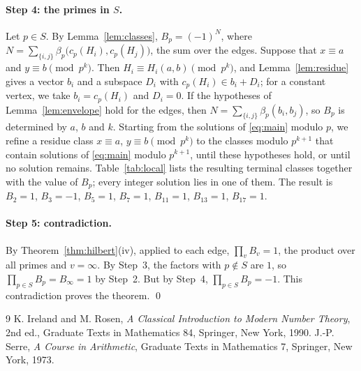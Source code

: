 \documentclass[11pt]{article}
\begin{document}
\paragraph{Step 4: the primes in $S$.} Let $p\in S$. By Lemma~\ref{lem:classes}, $B_p=(-1)^{N}$, where $N=\sum_{\{i,j\}}\beta_p\bigl(c_p(H_i),c_p(H_j)\bigr)$, the sum over the edges. Suppose that $x\equiv a$ and $y\equiv b\pmod{p^k}$. Then $H_i\equiv H_i(a,b)\pmod{p^k}$, and Lemma~\ref{lem:residue} gives a vector $b_i$ and a subspace $D_i$ with $c_p(H_i)\in b_i+D_i$; for a constant vertex, we take $b_i=c_p(H_i)$ and $D_i=0$. If the hypotheses of Lemma~\ref{lem:envelope} hold for the edges, then $N=\sum_{\{i,j\}}\beta_p(b_i,b_j)$, so $B_p$ is determined by $a$, $b$ and $k$. Starting from the solutions of \eqref{eq:main} modulo $p$, we refine a residue class $x\equiv a$, $y\equiv b\pmod{p^k}$ to the classes modulo $p^{k+1}$ that contain solutions of \eqref{eq:main} modulo $p^{k+1}$, until these hypotheses hold, or until no solution remains. Table~\ref{tab:local} lists the resulting terminal classes together with the value of $B_p$; every integer solution lies in one of them. The result is $B_{2}=1$, $B_{3}=-1$, $B_{5}=1$, $B_{7}=1$, $B_{11}=1$, $B_{13}=1$, $B_{17}=1$.

\paragraph{Step 5: contradiction.} By Theorem~\ref{thm:hilbert}(iv), applied to each edge, $\prod_vB_v=1$, the product over all primes and $v=\infty$. By Step~3, the factors with $p\notin S$ are $1$, so $\prod_{p\in S}B_p=B_\infty=1$ by Step~2. But by Step~4, $\prod_{p\in S}B_p=-1$. This contradiction proves the theorem.
\qed

\begin{thebibliography}{9}
 K. Ireland and M. Rosen, \emph{A Classical Introduction to Modern Number Theory}, 2nd ed., Graduate Texts in Mathematics 84, Springer, New York, 1990.
 J.-P. Serre, \emph{A Course in Arithmetic}, Graduate Texts in Mathematics 7, Springer, New York, 1973.
\end{thebibliography}
\end{document}
